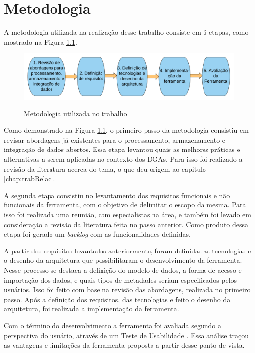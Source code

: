 
\chapter{Metodologia}
\label{chap:metodologia}

A metodologia utilizada na realização desse trabalho consiste em 6 etapas, 
como mostrado na Figura \ref{fig:metodologia}.

\begin{figure}[!htb]
    \centering
    \caption{Metodologia utilizada no trabalho}
    \includegraphics[width=1\textwidth]{./04-figuras/metodologia}
    \label{fig:metodologia}
\end{figure}


Como demonstrado na Figura \ref{fig:metodologia}, o primeiro passo da metodologia consistiu 
em revisar abordagens já existentes para o processamento, armazenamento e integração de dados abertos. 
Essa etapa levantou quais as melhores práticas e alternativas a serem aplicadas no contexto dos 
DGAs. Para isso foi realizado a revisão da literatura acerca do tema, o que deu origem ao 
capitulo \ref{chap:trabRelac}.

A segunda etapa consistiu no levantamento dos requisitos funcionais e não funcionais da 
ferramenta, com o objetivo de delimitar o escopo da mesma. Para isso foi realizada uma reunião,
com especialistas na área, e também foi levado em consideração a revisão da literatura 
feita no passo anterior. Como produto dessa etapa foi gerado um \textit{backlog} com as 
funcionalidades definidas.

A partir dos requisitos levantados anteriormente, foram definidas as tecnologias e o desenho 
da arquitetura que possibilitaram o desenvolvimento da ferramenta. Nesse processo se destaca 
a definição do modelo de dados, a forma de acesso e importação dos dados, e quais tipos de 
metadados seriam especificados pelos usuários. Isso foi feito com base na revisão das 
abordagens, realizada no primeiro passo. Após a definição dos requisitos, das tecnologias e 
feito o desenho da arquitetura, foi realizada a implementação da ferramenta.

Com o término do desenvolvimento a ferramenta foi avaliada segundo a perspectiva do usuário,
através de um Teste de Usabilidade \cite{barbosa2010}. Essa análise traçou as vantagens e 
limitações da ferramenta proposta a partir desse ponto de vista.
